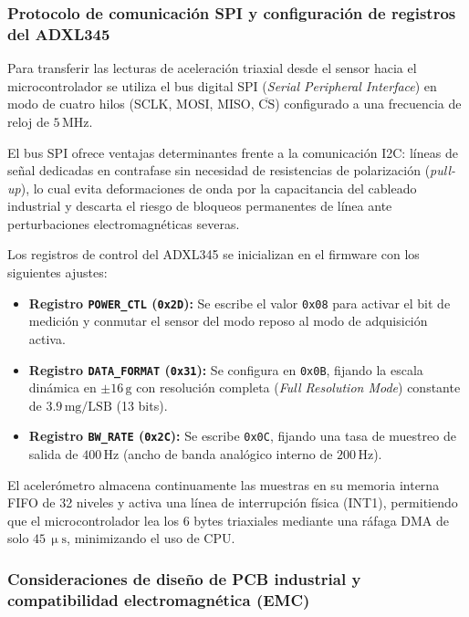 \subsubsection{Protocolo de comunicación SPI y configuración de registros del ADXL345}

Para transferir las lecturas de aceleración triaxial desde el sensor hacia el microcontrolador se utiliza el bus digital SPI (\textit{Serial Peripheral Interface}) en modo de cuatro hilos (SCLK, MOSI, MISO, $\overline{\text{CS}}$) configurado a una frecuencia de reloj de $5\,\text{MHz}$.

El bus SPI ofrece ventajas determinantes frente a la comunicación I2C: líneas de señal dedicadas en contrafase sin necesidad de resistencias de polarización (\textit{pull-up}), lo cual evita deformaciones de onda por la capacitancia del cableado industrial y descarta el riesgo de bloqueos permanentes de línea ante perturbaciones electromagnéticas severas.

Los registros de control del ADXL345 se inicializan en el firmware con los siguientes ajustes:
\begin{itemize}
    \item \textbf{Registro \texttt{POWER\_CTL} (\texttt{0x2D}):} Se escribe el valor \texttt{0x08} para activar el bit de medición y conmutar el sensor del modo reposo al modo de adquisición activa.
    \item \textbf{Registro \texttt{DATA\_FORMAT} (\texttt{0x31}):} Se configura en \texttt{0x0B}, fijando la escala dinámica en $\pm 16\,\text{g}$ con resolución completa (\textit{Full Resolution Mode}) constante de $3.9\,\text{mg/LSB}$ (13 bits).
    \item \textbf{Registro \texttt{BW\_RATE} (\texttt{0x2C}):} Se escribe \texttt{0x0C}, fijando una tasa de muestreo de salida de $400\,\text{Hz}$ (ancho de banda analógico interno de $200\,\text{Hz}$).
\end{itemize}

El acelerómetro almacena continuamente las muestras en su memoria interna FIFO de 32 niveles y activa una línea de interrupción física (INT1), permitiendo que el microcontrolador lea los 6 bytes triaxiales mediante una ráfaga DMA de solo $45\,\upmu\text{s}$, minimizando el uso de CPU.


\subsubsection{Consideraciones de diseño de PCB industrial y compatibilidad electromagnética (EMC)}

